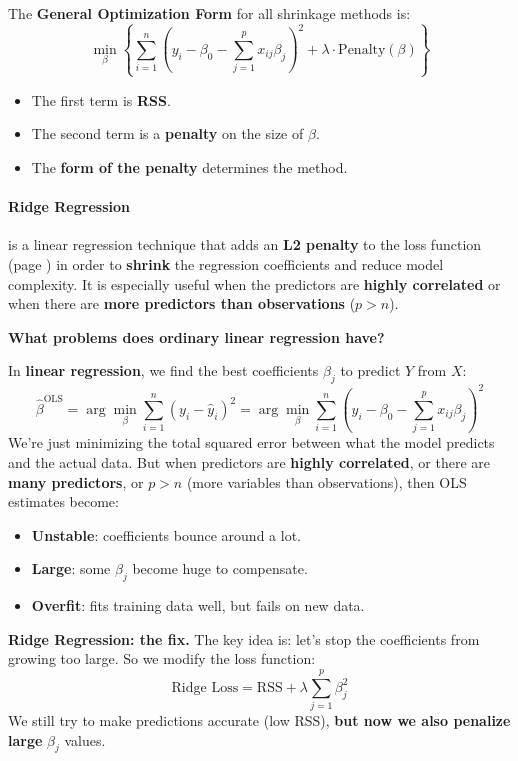 \noindent
The \textbf{General Optimization Form} for all shrinkage methods is:
\begin{equation}
    \min_{\beta} \left\{ \sum_{i=1}^{n} (y_i - \beta_0 - \sum_{j=1}^{p} x_{ij} \beta_j)^2 + \lambda \cdot \text{Penalty}(\beta) \right\}
\end{equation}
\begin{itemize}
    \item The first term is \textbf{RSS}.
    \item The second term is a \textbf{penalty} on the size of $\beta$.
    \item The \textbf{form of the penalty} determines the method.
\end{itemize}

\newpage

\paragraph{Ridge Regression}\label{paragraph: Ridge Regression}

 is a linear regression technique that adds an \textbf{L2 penalty} to the loss function (page \pageref{def: Loss Function}) in order to \textbf{shrink} the regression coefficients and reduce model complexity. It is especially useful when the predictors are \textbf{highly correlated} or when there are \textbf{more predictors than observations} ($p > n$).

\begin{flushleft}
    \textcolor{Red2}{ \textbf{What problems does ordinary linear regression have?}}
\end{flushleft}
In \textbf{linear regression}, we find the best coefficients $\beta_j$ to predict $Y$ from $X$:
\begin{equation*}
    \hat{\beta}^{\text{OLS}} = \arg\min_{\beta} \sum_{i=1}^n (y_i - \hat{y}_i)^2 = \arg\min_{\beta} \sum_{i=1}^n \left(y_i - \beta_0 - \sum_{j=1}^p x_{ij} \beta_j\right)^2
\end{equation*}
We're just minimizing the total squared error between what the model predicts and the actual data. But when predictors are \textbf{highly correlated}, or there are \textbf{many predictors}, or $p > n$ (more variables than observations), then OLS estimates become:
\begin{itemize}[label=\textcolor{Red2}{}]
    \item \textbf{Unstable}: coefficients bounce around a lot.
    \item \textbf{Large}: some $\beta_j$ become huge to compensate.
    \item \textbf{Overfit}: fits training data well, but fails on new data.
\end{itemize}
\textcolor{Green3}{ \textbf{Ridge Regression: the fix.}} The key idea is: let's stop the coefficients from growing too large. So we modify the loss function:
\begin{equation*}
    \text{Ridge Loss} = \text{RSS} + \lambda \sum_{j=1}^p \beta_j^2
\end{equation*}
We still try to make predictions accurate (low RSS), \textbf{but now we also penalize large} $\beta_j$ values.

